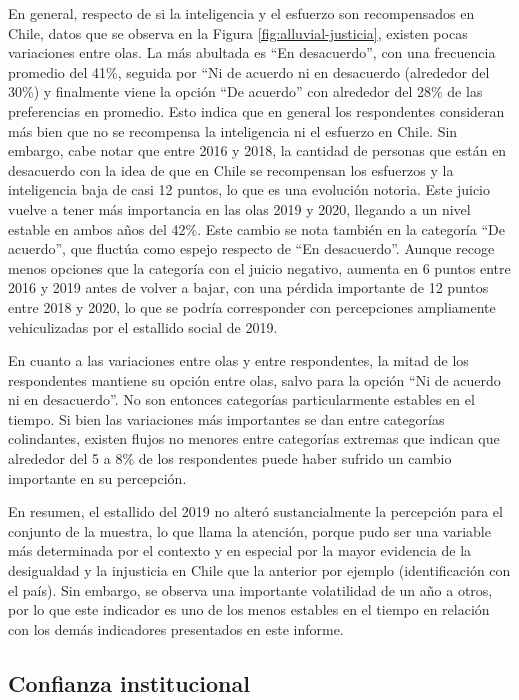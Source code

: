 \documentclass[
  12pt,
]{book}
\begin{document}
En general, respecto de si la inteligencia y el esfuerzo son recompensados en Chile, datos que se observa en la Figura \ref{fig:alluvial-justicia}, existen pocas variaciones entre olas. La más abultada es ``En desacuerdo'', con una frecuencia promedio del 41\%, seguida por ``Ni de acuerdo ni en desacuerdo (alrededor del 30\%) y finalmente viene la opción ``De acuerdo'' con alrededor del 28\% de las preferencias en promedio. Esto indica que en general los respondentes consideran más bien que no se recompensa la inteligencia ni el esfuerzo en Chile. Sin embargo, cabe notar que entre 2016 y 2018, la cantidad de personas que están en desacuerdo con la idea de que en Chile se recompensan los esfuerzos y la inteligencia baja de casi 12 puntos, lo que es una evolución notoria. Este juicio vuelve a tener más importancia en las olas 2019 y 2020, llegando a un nivel estable en ambos años del 42\%. Este cambio se nota también en la categoría ``De acuerdo'', que fluctúa como espejo respecto de ``En desacuerdo''. Aunque recoge menos opciones que la categoría con el juicio negativo, aumenta en 6 puntos entre 2016 y 2019 antes de volver a bajar, con una pérdida importante de 12 puntos entre 2018 y 2020, lo que se podría corresponder con percepciones ampliamente vehiculizadas por el estallido social de 2019.

En cuanto a las variaciones entre olas y entre respondentes, la mitad de los respondentes mantiene su opción entre olas, salvo para la opción ``Ni de acuerdo ni en desacuerdo''. No son entonces categorías particularmente estables en el tiempo. Si bien las variaciones más importantes se dan entre categorías colindantes, existen flujos no menores entre categorías extremas que indican que alrededor del 5 a 8\% de los respondentes puede haber sufrido un cambio importante en su percepción.

En resumen, el estallido del 2019 no alteró sustancialmente la percepción para el conjunto de la muestra, lo que llama la atención, porque pudo ser una variable más determinada por el contexto y en especial por la mayor evidencia de la desigualdad y la injusticia en Chile que la anterior por ejemplo (identificación con el país). Sin embargo, se observa una importante volatilidad de un año a otros, por lo que este indicador es uno de los menos estables en el tiempo en relación con los demás indicadores presentados en este informe.

\hypertarget{confianza-institucional}{%
\subsection{Confianza institucional}\label{confianza-institucional}}
\end{document}
